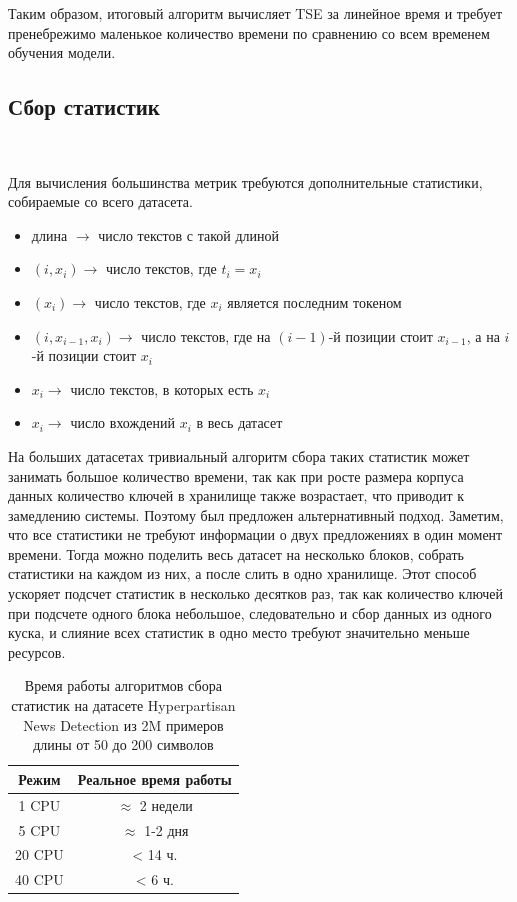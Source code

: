 \documentclass{spbau-diploma}
\begin{document}
Таким образом, итоговый алгоритм вычисляет TSE за линейное время и требует пренебрежимо маленькое количество времени по сравнению со всем временем обучения модели.

\subsection{Сбор статистик}
\ 

Для вычисления большинства метрик требуются дополнительные статистики, собираемые со всего датасета.

\begin{itemize}
	\item длина $\rightarrow$ число текстов с такой длиной
	\item $(i, x_i) \rightarrow$ число текстов, где $t_i = x_i$ 
	\item $(x_i)\rightarrow$ число текстов, где $x_i$ является последним токеном
	\item $(i, x_{i-1}, x_i) \rightarrow$ число текстов, где на $(i-1)$-й позиции стоит $x_{i-1}$, а на $i$-й позиции стоит $x_i$
	\item $x_i \rightarrow$ число текстов, в которых есть $x_i$
	\item $x_i \rightarrow $ число вхождений $x_i$ в весь датасет
\end{itemize}

На больших датасетах тривиальный алгоритм сбора таких статистик может занимать большое количество времени, так как при росте размера корпуса данных количество ключей в хранилище также возрастает, что приводит к замедлению системы. Поэтому был предложен альтернативный подход. Заметим, что все статистики не требуют информации о двух предложениях в один момент времени. Тогда можно поделить весь датасет на несколько блоков, собрать статистики на каждом из них, а после слить в одно хранилище. Этот способ ускоряет подсчет статистик в несколько десятков раз, так как количество ключей при подсчете одного блока небольшое, следовательно и сбор данных из одного куска, и слияние всех статистик в одно место требуют значительно меньше ресурсов.

\begin{table}[h]
	\caption{Время работы алгоритмов сбора статистик на датасете Hyperpartisan News Detection из 2M примеров длины от 50 до 200 символов}
	\label{table:collect_stats_time}
	\centering
	\begin{tabular}{|c|c|}
		\hline
		Режим & Реальное время работы \\
		\hline
		1 CPU & $\approx$ 2 недели \\
		5 CPU & $\approx$ 1-2 дня \\
		20 CPU & < 14 ч. \\
		40 CPU & < 6 ч. \\
		\hline
	\end{tabular}
\end{table}
\end{document}
